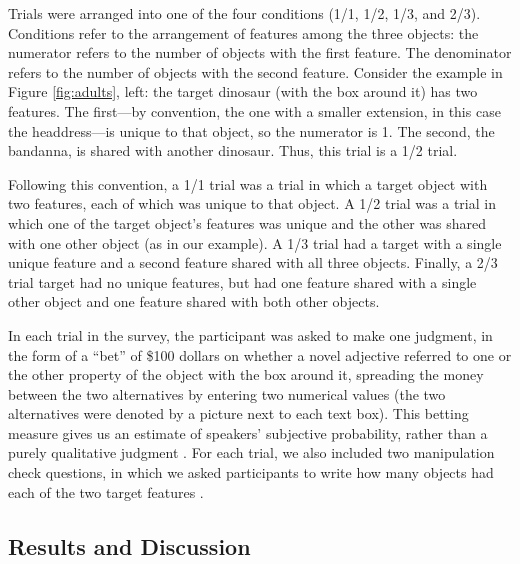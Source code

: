 \documentclass[review]{elsarticle}
\begin{document}
Trials were arranged into one of the four conditions (1/1, 1/2, 1/3, and 2/3). Conditions refer to the arrangement of features among the three objects: the numerator refers to the number of objects with the first feature. The denominator refers to the number of objects with the second feature. Consider the example in Figure \ref{fig:adults}, left: the target dinosaur (with the box around it) has two features. The first---by convention, the one with a smaller extension, in this case the headdress---is unique to that object, so the numerator is 1. The second, the bandanna, is shared with another dinosaur. Thus, this trial is a 1/2 trial. 

Following this convention, a 1/1 trial was a trial in which a target object with two features, each of which was unique to that object. A 1/2 trial was a trial in which one of the target object's features was unique and the other was shared with one other object (as in our example). A 1/3 trial had a target with a single unique feature and a second feature shared with all three objects. Finally, a 2/3 trial target had no unique features, but had one feature shared with a single other object and one feature shared with both other objects. 

In each trial in the survey, the participant was asked to make one judgment, in the form of a ``bet'' of \$100 dollars on whether a novel adjective referred to one or the other property of the object with the box around it, spreading the money between the two alternatives by entering two numerical values (the two alternatives were denoted by a picture next to each text box). This betting measure gives us an estimate of speakers' subjective probability, rather than a purely qualitative judgment \citep{frank2012}. For each trial, we also included two manipulation check questions, in which we asked participants to write how many objects had each of the two target features \citep{oppenheimer2009,crump2013}. 

\subsection{Results and Discussion}
\end{document}
